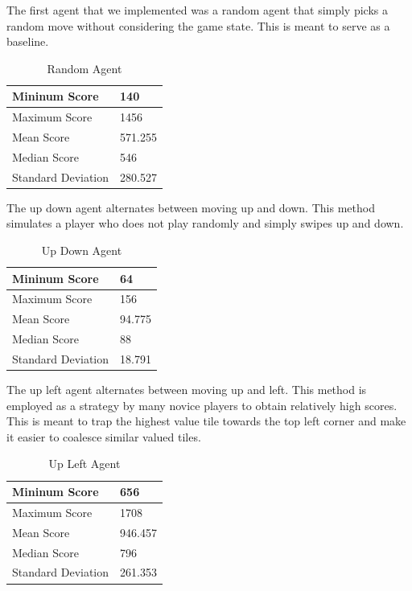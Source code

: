\documentclass[9pt,twocolumn]{article}
\begin{document}
The first agent that we implemented was a random agent that simply picks a random move without considering the game state. This is meant to serve as a baseline.

\begin{table}[!htbp]

\centering

\begin{tabular}{|l|l|}
\hline
Mininum Score      & 140 \\ \hline
Maximum Score      & 1456 \\ \hline
Mean Score         & 571.255 \\ \hline
Median Score       & 546 \\ \hline
Standard Deviation & 280.527 \\ \hline
\end{tabular}

\caption{Random Agent}

\end{table}

The up down agent alternates between moving up and down. This method simulates a player who does not play randomly and simply swipes up and down.

\begin{table}[!htbp]

\centering

\begin{tabular}{|l|l|}
\hline
Mininum Score      & 64 \\ \hline
Maximum Score      & 156 \\ \hline
Mean Score         & 94.775 \\ \hline
Median Score       & 88 \\ \hline
Standard Deviation & 18.791 \\ \hline
\end{tabular}

\caption{Up Down Agent}

\end{table}

The up left agent alternates between moving up and left. This method is employed as a strategy by many novice players to obtain relatively high scores. This is meant to trap the highest value tile towards the top left corner and make it easier to coalesce similar valued tiles.

\begin{table}[!htbp]

\centering

\begin{tabular}{|l|l|}
\hline
Mininum Score      & 656 \\ \hline
Maximum Score      & 1708 \\ \hline
Mean Score         & 946.457 \\ \hline
Median Score       & 796 \\ \hline
Standard Deviation & 261.353 \\ \hline
\end{tabular}

\caption{Up Left Agent}

\end{table}
\end{document}
